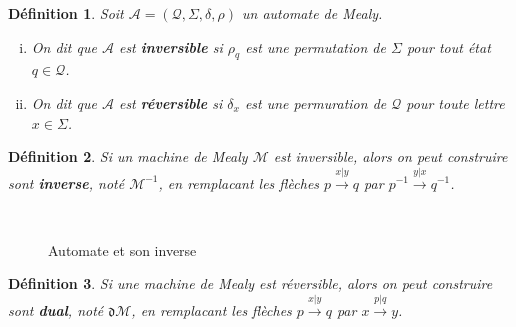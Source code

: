 \documentclass[11pt,a4paper]{article}
\newtheorem{definition}{Définition}
\begin{document}
\begin{definition}
  Soit $\mathcal{A}=\left(\mathcal{Q}, \Sigma, \delta, \rho\right)$ un automate de Mealy.
  \begin{enumerate}[(i)]
  \item On dit que $\mathcal{A}$ est \textbf{inversible} si $\rho_q$ est une permutation de $\Sigma$ pour tout état $q\in\mathcal{Q}$.
  \item On dit que $\mathcal{A}$ est \textbf{réversible} si $\delta_x$ est une permuration de $\mathcal{Q}$ pour toute lettre $x\in\Sigma$.
  \end{enumerate}
\end{definition}

\begin{definition}
  Si un machine de Mealy $\mathcal{M}$ est inversible, alors on peut construire sont \textbf{\textit{inverse}}, noté $\mathcal{M}^{-1}$, en remplacant les flèches $p\overset{x|y}{\longrightarrow}q$ par $p^{-1}\overset{y|x}{\longrightarrow}q^{-1}$.
\end{definition}


\begin{figure}[h!]
  \begin{subfigure}[b]{0.5\textwidth}
    \centering
  \end{subfigure}
  ~
  \begin{subfigure}[b]{0.5\textwidth}
    \centering
  \end{subfigure}
  \caption{Automate et son inverse}
\end{figure}


\begin{definition}
  Si une machine de Mealy est réversible, alors on peut construire sont \textbf{\textit{dual}}, noté $\mathfrak{d}\mathcal{M}$, en remplacant les flèches $p\overset{x|y}{\longrightarrow}q$ par $x\overset{p|q}{\longrightarrow}y$.
\end{definition}
\end{document}
